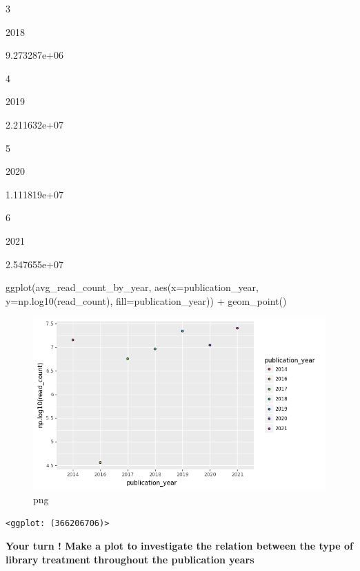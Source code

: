 \documentclass[
  letterpaper,
]{book}
\newenvironment{Shaded}{}{}
\newcommand{\NormalTok}[1]{\textcolor[rgb]{0.14,0.16,0.18}{#1}}
\newcommand{\OperatorTok}[1]{\textcolor[rgb]{0.14,0.16,0.18}{#1}}
\newcommand{\StringTok}[1]{\textcolor[rgb]{0.01,0.18,0.38}{#1}}
\begin{document}
3

2018

9.273287e+06

4

2019

2.211632e+07

5

2020

1.111819e+07

6

2021

2.547655e+07

\begin{Shaded}
\begin{Highlighting}[]
\NormalTok{ggplot(avg\_read\_count\_by\_year, aes(x}\OperatorTok{=}\StringTok{\textquotesingle{}publication\_year\textquotesingle{}}\NormalTok{, y}\OperatorTok{=}\StringTok{\textquotesingle{}np.log10(read\_count)\textquotesingle{}}\NormalTok{, fill}\OperatorTok{=}\StringTok{\textquotesingle{}publication\_year\textquotesingle{}}\NormalTok{)) }\OperatorTok{+}\NormalTok{ geom\_point()}
\end{Highlighting}
\end{Shaded}

\begin{figure}

{\centering \includegraphics{assets/images/chapters/introduction-to-python/tutorial_117_0.png}

}

\caption{png}

\end{figure}

\begin{verbatim}
<ggplot: (366206706)>
\end{verbatim}

\textbf{Your turn ! Make a plot to investigate the relation between the
type of library treatment throughout the publication years}
\end{document}
